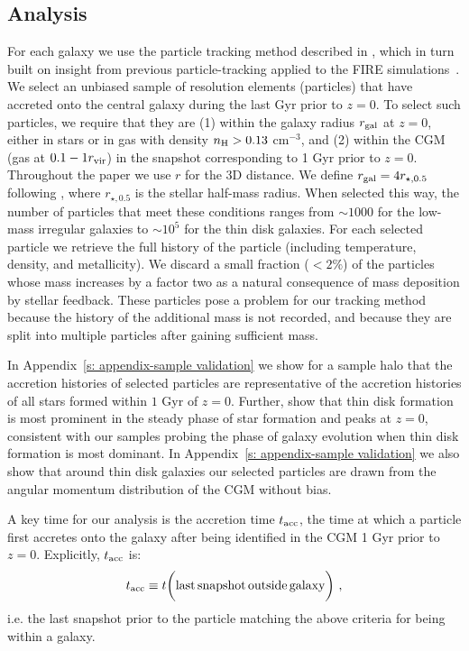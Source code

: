 \documentclass[fleqn,usenatbib]{mnras}
\newcommand{\tacc}{t_{\rm acc}}
\newcommand{\Rvir}{r_{\rm vir}}
\begin{document}
\subsection{Analysis}
\label{s: methods -- analysis}

For each galaxy we use the particle tracking method described in \cite{Hafen2019, Hafen2020}, which in turn built on insight from previous particle-tracking applied to the FIRE simulations~\citep{Angles-Alcazar2017}.
We select an unbiased sample of resolution elements (particles) that have accreted onto the central galaxy during the last Gyr prior to $z=0$.
To select such particles, we require that they are
(1) within the galaxy radius $r_{\rm gal}$ at $z=0$, either in stars or in gas with density  $n_{\rm H} > 0.13$ cm$^{-3}$, and
(2) within the CGM (gas at $0.1 - 1 \Rvir$) in the snapshot corresponding to 1 Gyr prior to $z=0$.
Throughout the paper we use $r$ for the 3D distance. 
We define $r_{\rm gal} = 4 r_{\star,0.5}$ following \cite{Hafen2019, Hafen2020}, where $r_{\star, 0.5}$ is the stellar half-mass radius.
When selected this way, the number of particles that meet these conditions ranges from $\sim 1000$ for the low-mass irregular galaxies to $\sim 10^5$ for the thin disk galaxies.
For each selected particle we retrieve the full history of the particle (including temperature, density, and metallicity). 
We discard a small fraction ($<2\%$) of the particles whose mass increases by a factor two as a natural consequence of mass deposition by stellar feedback.
These particles pose a problem for our tracking method because the history of the additional mass is not recorded, and because they are split into multiple particles after gaining sufficient mass.

In Appendix~\ref{s: appendix-sample validation} we show for a sample halo that the accretion histories of selected particles are representative of the accretion histories of all stars formed within $1$ Gyr of $z=0$.
Further, \cite{Yu2021} show that thin disk formation is most prominent in the steady phase of star formation and peaks at $z=0$, consistent with our samples probing the phase of galaxy evolution when thin disk formation is most dominant.
In Appendix~\ref{s: appendix-sample validation} we also show that around thin disk galaxies our selected particles are drawn from the angular momentum distribution of the CGM without bias.

A key time for our analysis is the accretion time $\tacc$, the time at which a particle first accretes onto the galaxy after being identified in the CGM 1 Gyr prior to $z=0$.
Explicitly, $\tacc$ is:
\begin{equation}
    \tacc \equiv t \bigg( {\rm last\,snapshot\,outside\,galaxy} \bigg) ~,
\label{e: tacc}
\end{equation}
i.e. the last snapshot prior to the particle matching the above criteria for being within a galaxy.
\end{document}
